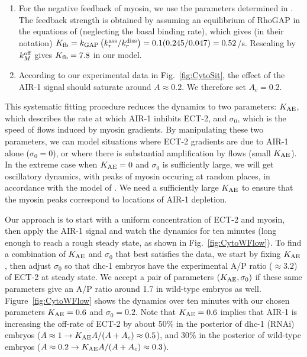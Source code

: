 \documentclass[11pt]{article}
\begin{document}
\begin{appendix}
\begin{enumerate}
\item For the negative feedback of myosin, we use the parameters determined in \citep{michaux2018excitable}. The feedback strength is obtained by assuming an equilibrium of RhoGAP in the equations of \citep{michaux2018excitable} (neglecting the basal binding rate), which gives (in their notation) $K_\text{fb}=k_\text{GAP}\left(k_r^\text{ass}/k_r^\text{diss}\right)=0.1(0.245/0.047)=0.52$/s. Rescaling by $k^\text{off}_M$ gives $K_\text{fb}=7.8$ in our model. 
\item According to our experimental data in Fig.\ \ref{fig:CytoSit}, the effect of the AIR-1 signal should saturate around $A \approx 0.2$. We therefore set $A_c=0.2$. 
\end{enumerate}
This systematic fitting procedure reduces the dynamics to two parameters: $K_\text{AE}$, which describes the rate at which AIR-1 inhibits ECT-2, and $\sigma_0$, which is the speed of flows induced by myosin gradients. By manipulating these two parameters, we can model situations where ECT-2 gradients are due to AIR-1 alone ($\sigma_0 = 0$), or where there is substantial amplification by flows (small $K_\text{AE}$). In the extreme case when $K_\text{AE}=0$ and $\sigma_0$ is sufficiently large, we will get oscillatory dynamics, with peaks of myosin occuring at random places, in accordance with the model of \citep{michaux2018excitable}. We need a sufficiently large $K_\text{AE}$ to ensure that the myosin peaks correspond to locations of AIR-1 depletion.

Our approach is to start with a uniform concentration of ECT-2 and myosin, then apply the AIR-1 signal and watch the dynamics for ten minutes (long enough to reach a rough steady state, as shown in Fig.\ \ref{fig:CytoWFlow}). To find a combination of $K_\text{AE}$ and $\sigma_0$ that best satisfies the data, we start by fixing $K_\text{AE}$, then adjust $\sigma_0$ so that dhc-1 embryos have the experimental A/P ratio ($\approx 3.2$) of ECT-2 at steady state. We accept a pair of parameters $\left(K_\text{AE},\sigma_0\right)$ if these same parameters give an A/P ratio around 1.7 in wild-type embryos as well. Figure\ \ref{fig:CytoWFlow} shows the dynamics over ten minutes with our chosen parameters $K_\text{AE}=0.6$ and $\sigma_0=0.2$. Note that $K_\text{AE}=0.6$ implies that AIR-1 is increasing the off-rate of ECT-2 by about 50\% in the posterior of dhc-1 (RNAi) embryos ($A \approx 1 \rightarrow K_\text{AE} A/(A+A_c) \approx 0.5$), and 30\% in the posterior of wild-type embryos ($A \approx 0.2 \rightarrow K_\text{AE} A/(A+A_c) \approx 0.3$).


\end{appendix}
\end{document}
